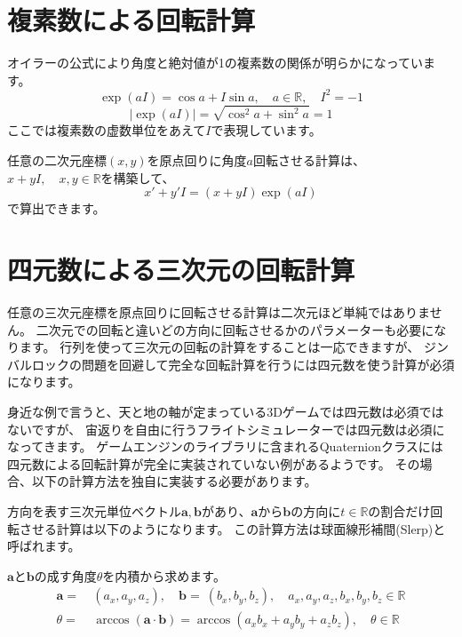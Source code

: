 \documentclass[a4paper,12pt,notitlepage]{jsreport}
\begin{document}
\section{複素数による回転計算}

オイラーの公式により角度と絶対値が1の複素数の関係が明らかになっています。
\begin{equation}
  \exp(aI)=\cos a+I\sin a,\quad a\in\mathbb{R},\quad I^2=-1
\end{equation}
\begin{equation}
  |\exp(aI)|=\sqrt{\cos^2 a+\sin^2 a}=1
\end{equation}
ここでは複素数の虚数単位をあえて$I$で表現しています。

任意の二次元座標$(x,y)$を原点回りに角度$a$回転させる計算は、$x+yI,\quad x,y\in\mathbb{R}$を構築して、
\begin{equation}
  x'+y'I=(x+yI)\exp(aI)
\end{equation}
で算出できます。

\section{四元数による三次元の回転計算}

任意の三次元座標を原点回りに回転させる計算は二次元ほど単純ではありません。
二次元での回転と違いどの方向に回転させるかのパラメーターも必要になります。
行列を使って三次元の回転の計算をすることは一応できますが、
ジンバルロックの問題を回避して完全な回転計算を行うには四元数を使う計算が必須になります。

身近な例で言うと、天と地の軸が定まっている3Dゲームでは四元数は必須ではないですが、
宙返りを自由に行うフライトシミュレーターでは四元数は必須になってきます。
ゲームエンジンのライブラリに含まれるQuaternionクラスには四元数による回転計算が完全に実装されていない例があるようです。
その場合、以下の計算方法を独自に実装する必要があります。

方向を表す三次元単位ベクトル$\bm{a},\bm{b}$があり、$\bm{a}$から$\bm{b}$の方向に$t\in\mathbb{R}$の割合だけ回転させる計算は以下のようになります。
この計算方法は球面線形補間(Slerp)と呼ばれます。

$\bm{a}$と$\bm{b}$の成す角度$\theta$を内積から求めます。
\begin{equation}
  \begin{split}
    \bm{a}=~&(a_x,a_y,a_z),\quad \bm{b}=~(b_x,b_y,b_z),\quad a_x,a_y,a_z,b_x,b_y,b_z\in\mathbb{R}\\
    \theta=~&\arccos(\bm{a}\cdot\bm{b})=\arccos(a_xb_x+a_yb_y+a_zb_z),\quad \theta\in\mathbb{R}
  \end{split}
\end{equation}
\end{document}
